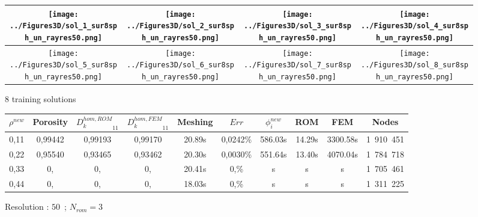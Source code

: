 {\ligneinter
\begin{figure}[H]%
%
\begin{center}
\begin{tabular}{|c|c|c|c|}
\hline
\texttt{[image: ../Figures3D/sol\_1\_sur8sph\_un\_rayres50.png]}%
&%
\texttt{[image: ../Figures3D/sol\_2\_sur8sph\_un\_rayres50.png]}%
&%
\texttt{[image: ../Figures3D/sol\_3\_sur8sph\_un\_rayres50.png]}%
&%
\texttt{[image: ../Figures3D/sol\_4\_sur8sph\_un\_rayres50.png]}%
\\
\hline
\texttt{[image: ../Figures3D/sol\_5\_sur8sph\_un\_rayres50.png]}%
&%
\texttt{[image: ../Figures3D/sol\_6\_sur8sph\_un\_rayres50.png]}%
&%
\texttt{[image: ../Figures3D/sol\_7\_sur8sph\_un\_rayres50.png]}%
&%
\texttt{[image: ../Figures3D/sol\_8\_sur8sph\_un\_rayres50.png]}%
\\
\hline
\end{tabular}
\end{center}
\caption{$8$ training solutions}
%
\end{figure}

\begin{figure}[H]%
%
\begin{center}
\begin{tabular}{|c|c||c|c||c|c||c|c||c||c|}
\hline
\rowcolor{lightgray} $\rho^{new}$&Porosity&${D_k^{hom,ROM}}_{11}$&${D_k^{hom,FEM}}_{11}$&Meshing&$Err$&$\phi_i^{new}$&ROM&FEM&Nodes\\
\hline
0,11&0,99442&0,99193&0,99170&20.89s&0,0242\%&586.03s&14.29s&3300.58s&1\ 910\ 451\\
\hline
0,22&0,95540&0,93465&0,93462&20.30s&0,0030\%&551.64s&13.40s&4070.04s&1\ 784\ 718\\
\hline
0,33&0,&0,&0,&20.41s&0,\%&s&s&s&1\ 705\ 461\\
\hline
0,44&0,&0,&0,&18.03s&0,\%&s&s&s&1\ 311\ 225\\
\hline
\end{tabular}
\end{center}
\caption{Resolution : $50$\ ; $N_{rom}=3$}
%
\end{figure}

\ligneinter

}
